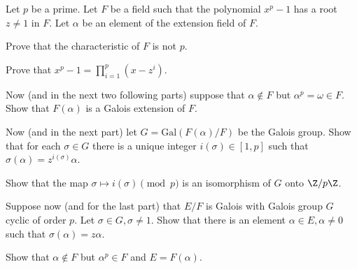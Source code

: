 Let $p$ be a prime. Let $F$ be a field such that the polynomial
$x^p-1$ has a root $z\neq 1$ in $F$. Let $\alpha$ be an element of
the extension field of $F$.
\begin{alist}
\item Prove that the characteristic of $F$ is not $p$.
\item Prove that $x^p-1=\prod_{i=1}^p(x-z^i)$.
\item Now (and in the next two following parts) suppose that 
$\alpha\notin F$ but $\alpha^p=\omega\in F$.
Show that $F(\alpha)$ is a Galois extension of $F$.
\item Now (and in the next part) let
$G=\mathrm{Gal}(F(\alpha)/F)$ be the Galois group.  Show that for each
$\sigma\in G$ there is a unique integer $i(\sigma)\in [1,p]$ such that
$\sigma(\alpha)=z^{i(\sigma)}\alpha$.
\item Show that the map $\sigma\mapsto i(\sigma) \pmod p$ is an
isomorphism of $G$ onto $\Z/p\Z$.
\item Suppose now (and for the last part) that $E/F$ is 
Galois with Galois group $G$ cyclic of order $p$. Let $\sigma\in
G,\sigma\neq 1$. Show that there is an element $\alpha\in E,\alpha\neq
0$ such that $\sigma(\alpha)=z\alpha$.
\item Show that $\alpha\notin F$ but $\alpha^p\in F$ and $E=F(\alpha)$.
\end{alist}
